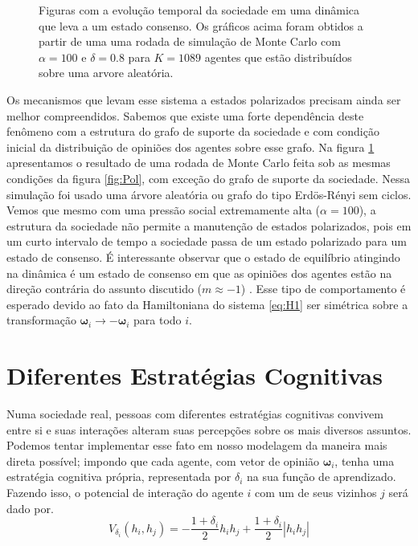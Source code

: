 \begin{figure}
\begin{subfigure}[]{0.45\textwidth}
   \caption{}
\end{subfigure}
\newline
\caption{
    Figuras com a evolução temporal da sociedade em uma dinâmica que leva
    a um estado consenso. Os gráficos acima foram obtidos a partir de uma uma
    rodada de simulação de Monte Carlo com $\alpha = 100$ e $\delta = 0.8$ para
    $K = 1089$ agentes que estão distribuídos sobre uma arvore aleatória.
}
\label{fig:Arvore}
\end{figure}

Os mecanismos que levam esse sistema a estados polarizados precisam ainda
ser melhor compreendidos. Sabemos que existe uma forte dependência deste
fenômeno com a estrutura do grafo de suporte da sociedade e com condição
inicial da distribuição de opiniões dos agentes sobre esse grafo. Na
figura \ref{fig:Arvore} apresentamos o resultado de uma rodada de Monte
Carlo feita sob as mesmas condições da figura \ref{fig:Pol}, com exceção
do grafo de suporte da sociedade. Nessa simulação foi usado uma árvore
aleatória ou grafo do tipo Erdös-Rényi sem ciclos. Vemos que mesmo
com uma pressão social extremamente alta ($\alpha = 100$), a estrutura da
sociedade não permite a manutenção de estados polarizados, pois em um
curto intervalo de tempo a sociedade passa de um estado polarizado para um
estado de consenso.  É interessante observar que o estado de equilíbrio
atingindo na dinâmica é um estado de consenso em que as opiniões dos
agentes estão na direção contrária do assunto discutido ($m \approx -1$)
. Esse tipo de comportamento é esperado devido ao fato da Hamiltoniana do
sistema \ref{eq:H1} ser simétrica sobre a transformação $\bm{\omega}_i
\rightarrow -\bm{\omega}_i$ para todo $i$.


\newpage
\section{Diferentes Estratégias Cognitivas} %
\label{sec:dd}

Numa sociedade real, pessoas com diferentes estratégias cognitivas convivem
entre si e suas interações alteram suas percepções sobre os mais diversos
assuntos. Podemos tentar implementar esse fato em nosso modelagem da maneira
mais direta possível; impondo que cada agente, com vetor de opinião
$\bm{\omega}_i$, tenha uma estratégia cognitiva própria, representada por
$\delta_i$ na sua função de aprendizado.  Fazendo isso, o potencial de
interação do agente $i$ com um de seus vizinhos $j$ será dado por.
\begin{equation}
V_{\delta_i}\left(h_i,h_j\right) = -\frac{1 + \delta_i}{2}h_ih_j 
        + \frac{1 + \delta_i}{2}\left|h_ih_j\right| 
\end{equation}

